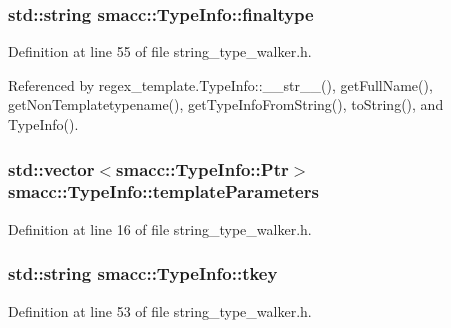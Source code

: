 \subsubsection[{\texorpdfstring{finaltype}{finaltype}}]{\setlength{\rightskip}{0pt plus 5cm}std\+::string smacc\+::\+Type\+Info\+::finaltype\hspace{0.3cm}{\ttfamily [private]}}\hypertarget{classsmacc_1_1TypeInfo_ae01f09534a045d2f097a62e9c87cae3d}{}\label{classsmacc_1_1TypeInfo_ae01f09534a045d2f097a62e9c87cae3d}


Definition at line 55 of file string\+\_\+type\+\_\+walker.\+h.



Referenced by regex\+\_\+template.\+Type\+Info\+::\+\_\+\+\_\+str\+\_\+\+\_\+(), get\+Full\+Name(), get\+Non\+Templatetypename(), get\+Type\+Info\+From\+String(), to\+String(), and Type\+Info().

\subsubsection[{\texorpdfstring{template\+Parameters}{templateParameters}}]{\setlength{\rightskip}{0pt plus 5cm}std\+::vector$<${\bf smacc\+::\+Type\+Info\+::\+Ptr}$>$ smacc\+::\+Type\+Info\+::template\+Parameters}\hypertarget{classsmacc_1_1TypeInfo_af50766217e1dcb5c25253c94affd6518}{}\label{classsmacc_1_1TypeInfo_af50766217e1dcb5c25253c94affd6518}


Definition at line 16 of file string\+\_\+type\+\_\+walker.\+h.

\subsubsection[{\texorpdfstring{tkey}{tkey}}]{\setlength{\rightskip}{0pt plus 5cm}std\+::string smacc\+::\+Type\+Info\+::tkey\hspace{0.3cm}{\ttfamily [private]}}\hypertarget{classsmacc_1_1TypeInfo_ab61d47adea9dbc8b678e06f627d6b1a3}{}\label{classsmacc_1_1TypeInfo_ab61d47adea9dbc8b678e06f627d6b1a3}


Definition at line 53 of file string\+\_\+type\+\_\+walker.\+h.



